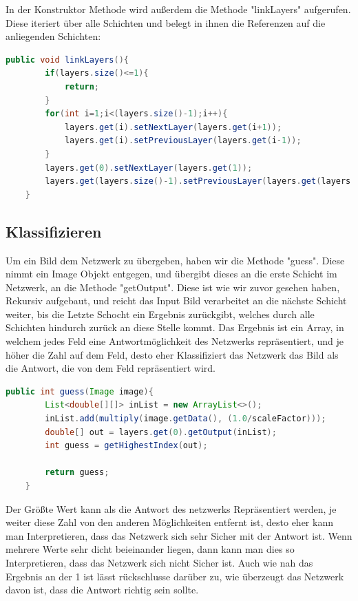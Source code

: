 \documentclass[12pt]{article}
\begin{document}
In der Konstruktor Methode wird außerdem die Methode "linkLayers" aufgerufen. Diese iteriert über alle Schichten und belegt in ihnen die Referenzen auf die anliegenden Schichten:
\begin{lstlisting}[language=Java]
    public void linkLayers(){
        if(layers.size()<=1){
            return;
        }
        for(int i=1;i<(layers.size()-1);i++){
            layers.get(i).setNextLayer(layers.get(i+1));
            layers.get(i).setPreviousLayer(layers.get(i-1));
        }
        layers.get(0).setNextLayer(layers.get(1));
        layers.get(layers.size()-1).setPreviousLayer(layers.get(layers.size()-2));
    }
\end{lstlisting}

\subsection{Klassifizieren}

Um ein Bild dem Netzwerk zu übergeben, haben wir die Methode "guess". Diese nimmt ein Image Objekt entgegen, und übergibt dieses an die erste Schicht im Netzwerk, an die Methode "getOutput". Diese ist wie wir zuvor gesehen haben, Rekursiv aufgebaut, und reicht das Input Bild verarbeitet an die nächste Schicht weiter, bis die Letzte Schocht ein Ergebnis zurückgibt, welches durch alle Schichten hindurch zurück an diese Stelle kommt. Das Ergebnis ist ein Array, in welchem jedes Feld eine Antwortmöglichkeit des Netzwerks repräsentiert, und je höher die Zahl auf dem Feld, desto eher Klassifiziert das Netzwerk das Bild als die Antwort, die von dem Feld repräsentiert wird.
\begin{lstlisting}[language=Java]
public int guess(Image image){
        List<double[][]> inList = new ArrayList<>();
        inList.add(multiply(image.getData(), (1.0/scaleFactor)));
        double[] out = layers.get(0).getOutput(inList);
        int guess = getHighestIndex(out);
        
        return guess;
    }
\end{lstlisting}
Der Größte Wert kann als die Antwort des netzwerks Repräsentiert werden, je weiter diese Zahl von den anderen Möglichkeiten entfernt ist, desto eher kann man Interpretieren, dass das Netzwerk sich sehr Sicher mit der Antwort ist. Wenn mehrere Werte sehr dicht beieinander liegen, dann kann man dies so Interpretieren, dass das Netzwerk sich nicht Sicher ist. Auch wie nah das Ergebnis an der 1 ist lässt rückschlusse darüber zu, wie überzeugt das Netzwerk davon ist, dass die Antwort richtig sein sollte.
\end{document}
